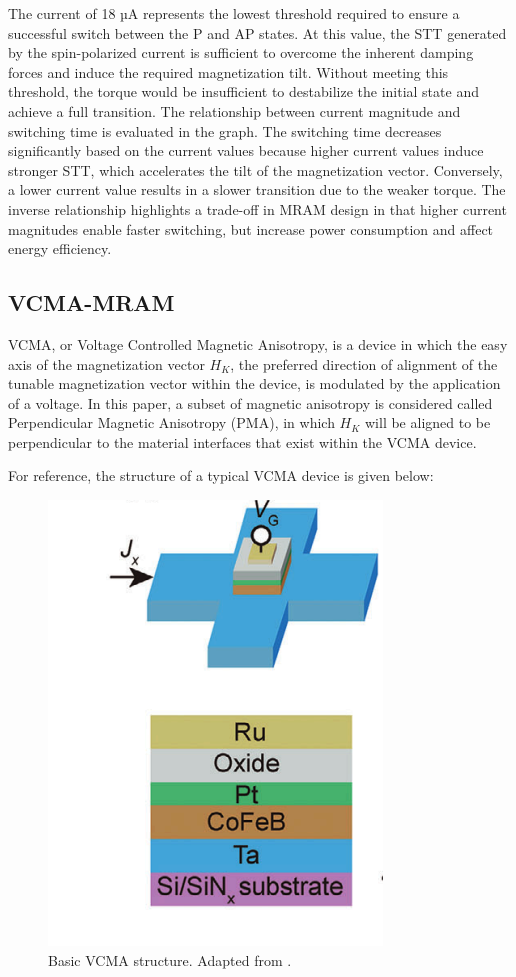 \documentclass[conference]{IEEEtran}
\begin{document}
The current of 18 µA represents the lowest threshold required to ensure a successful switch between the P and AP states. At this value, the STT generated by the spin-polarized current is sufficient to overcome the inherent damping forces and induce the required magnetization tilt. Without meeting this threshold, the torque would be insufficient to destabilize the initial state and achieve a full transition. The relationship between current magnitude and switching time is evaluated in the graph. The switching time decreases significantly based on the current values because higher current values induce stronger STT, which accelerates the tilt of the magnetization vector. Conversely, a lower current value results in a slower transition due to the weaker torque. The inverse relationship highlights a trade-off in MRAM design in that higher current magnitudes enable faster switching, but increase power consumption and affect energy efficiency. 




\subsection{VCMA-MRAM}
VCMA, or Voltage Controlled Magnetic Anisotropy, is a device in which the easy axis of the magnetization vector $H_K$, the preferred direction of alignment of the tunable magnetization vector within the device, is modulated by the application of a voltage. In this paper, a subset of magnetic anisotropy is considered called Perpendicular Magnetic Anisotropy (PMA), in which $H_K$ will be aligned to be perpendicular to the material interfaces that exist within the VCMA device. 

For reference, the structure of a typical VCMA device is given below:
\begin{figure}
    \centering
    \includegraphics[width=0.5\linewidth]{VCMA_stacked_structure.png}
    \caption{Basic VCMA structure. Adapted from \cite{jeong_spintronic_2024}.}
    \label{fig:vcma-basic}
\end{figure}
\end{document}
